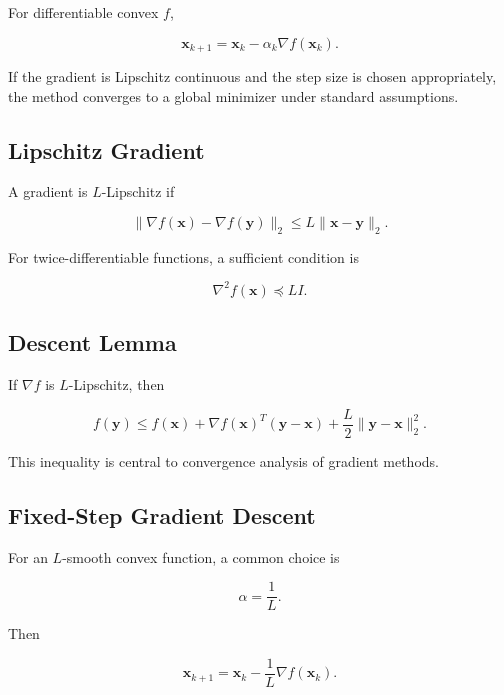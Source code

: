 For differentiable convex \(f\),

\[
\boxed{
\mathbf{x}_{k+1}
=
\mathbf{x}_k
-
\alpha_k
\nabla f(\mathbf{x}_k).
}
\]

If the gradient is Lipschitz continuous and the step size is chosen
appropriately, the method converges to a global minimizer under standard
assumptions.

\subsection{Lipschitz Gradient}
\label{subsec:lipschitz-gradient}

A gradient is \(L\)-Lipschitz if

\[
\boxed{
\|
\nabla f(\mathbf{x})
-
\nabla f(\mathbf{y})
\|_2
\leq
L
\|
\mathbf{x}-\mathbf{y}
\|_2.
}
\]

For twice-differentiable functions, a sufficient condition is

\[
\boxed{
\nabla^2f(\mathbf{x})
\preceq
LI.
}
\]

\subsection{Descent Lemma}
\label{subsec:descent-lemma}

If \(\nabla f\) is \(L\)-Lipschitz, then

\[
\boxed{
f(\mathbf{y})
\leq
f(\mathbf{x})
+
\nabla f(\mathbf{x})^T
(
\mathbf{y}-\mathbf{x}
)
+
\frac{L}{2}
\|
\mathbf{y}-\mathbf{x}
\|_2^2.
}
\]

This inequality is central to convergence analysis of gradient methods.

\subsection{Fixed-Step Gradient Descent}
\label{subsec:fixed-step-gradient-descent}

For an \(L\)-smooth convex function, a common choice is

\[
\boxed{
\alpha
=
\frac1L.
}
\]

Then

\[
\boxed{
\mathbf{x}_{k+1}
=
\mathbf{x}_k
-
\frac1L
\nabla f(\mathbf{x}_k).
}
\]

